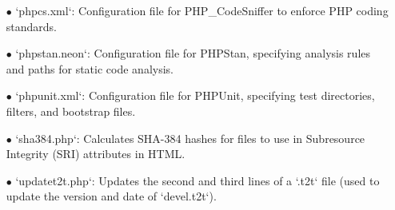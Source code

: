 \documentclass[a4paper]{article}
\begin{document}
\begin{itemize}
\item[\color{myblue}$\bullet$] `phpcs.xml`: Configuration file for PHP\_CodeSniffer to enforce PHP coding standards.
\item[\color{myblue}$\bullet$] `phpstan.neon`: Configuration file for PHPStan, specifying analysis rules and paths for static code analysis.
\item[\color{myblue}$\bullet$] `phpunit.xml`: Configuration file for PHPUnit, specifying test directories, filters, and bootstrap files.
\item[\color{myblue}$\bullet$] `sha384.php`: Calculates SHA-384 hashes for files to use in Subresource Integrity (SRI) attributes in HTML.
\item[\color{myblue}$\bullet$] `updatet2t.php`: Updates the second and third lines of a `.t2t` file (used to update the version and date of `devel.t2t`).

\end{itemize}

\end{document}
